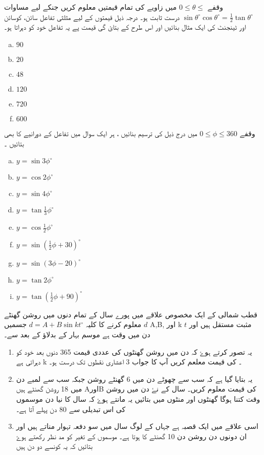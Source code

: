 
وقفے \( 0 \leq \theta \leq \)  میں زاویے کی تمام قیمتیں معلوم کریں جنکے لیے مساوات
 \( \sin\theta^{\circ}\cos\theta^{\circ}=\frac{1}{2}\tan\theta^{\circ} \) درست ثابت ہو۔
درجہ ذیل قیمتوں کے لیے مثلثی تفاعل سائن، کوسائن اور ٹینجنٹ کی ایک مثال بنائیں اور اس طرح کے بتائ گی قیمت پے یہ تفاعل خود کو دہراتا ہو۔
\begin{multicols}{3}
\begin{enumerate}[a.]
\item \( 90 \) 
\item \( 20 \) 
\item \( 48 \) 
\item \( 120 \) 
\item \( 720 \) 
\item \( 600 \) 
\end{enumerate}
\end{multicols}
وقفے \( 0 \leq \phi \leq 360 \) میں درج ذیل کی ترسیم بنائیں ، ہر ایک سوال میں تفاعل کے دورانیے کا بھی بتائیں ۔ 

\begin{multicols}{3}
\begin{enumerate}[a.]
\item \( y=\sin 3\phi^{\circ} \) 
\item \( y=\cos 2\phi^{\circ} \) 
\item \( y=\sin 4\phi^{\circ} \) 
\item \( y=\tan \frac{1}{3}\phi^{\circ} \) 
\item \( y=\cos \frac{1}{2}\phi^{\circ} \) 
\item \( y=\sin\left(\frac{1}{2}\phi+30\right)^{\circ} \) 
\item \( y=\sin\left(3\phi-20\right)^{\circ} \) 
\item \( y=\tan 2\phi^{\circ} \) 
\item \( y=\tan \left(\frac{1}{2}\phi+90\right)^{\circ} \) 
\end{enumerate}
\end{multicols}

قطب شمالی کے ایک مخصوص علاقے میں  پورے سال کے تمام  دنوں  میں روشن گھنٹے \( d \)  معلوم کرنے کا کلیہ \( d=A+B\sin kt^{\circ} \) جسمیں A,B,        اور  k
مثبت مستقل ہیں اور \( t \)  دن میں وقت ہے موسم بہار کے بدلاؤ کے بعد سے۔
\begin{enumerate}
\item        یہ تصور کرتے ہوۓ کہ دن میں روشن گھنٹوں کی عددی قیمت 365 دنوں بعد خود کو دہراتی ہے
k ۔  کی قیمت معلعم کریں  
آپ کا جواب 3 اعشاری نقطوں تک درست ہو۔
\item        یہ بتایا گیا ہے کہ سب سے چھوٹے دن میں 6 گھنٹے روشن جبکہ سب سے لمبے دن میں 18 روشن گھنٹے ہیں 
AاورB
کی قیمت معلوم کریں۔ سال کے نۓ دن میں روشن وقت کتنا ہوگا گھنٹوں اور منٹوں میں بتائیں یہ مانتے ہوۓ کہ سال کا نیا دن موسموں کی اس تبدیلی سے 80 دن پہلے آتا ہے۔
\item
اسی علاقے میں ایک قصبہ ہے جہاں کے لوگ سال میں سو دفعہ تہوار مناتے ہیں اور ان دونوں دن روشن دن 10 گھنٹے کا ہوتا ہے۔                    موسموں کے تغیر کو مد نظر رکھتے ہوۓ بتائیں کہ یہ کونسے دو دن ہیں
\end{enumerate}

